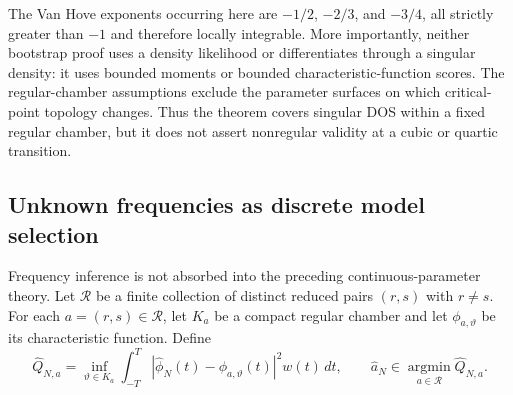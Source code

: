 \documentclass[11pt]{amsart}
\numberwithin{equation}{section}\setcounter{tocdepth}{3}\setcounter{secnumdepth}{3}
\begin{document}
The Van Hove exponents occurring here are $-1/2$, $-2/3$, and $-3/4$, all strictly
greater than $-1$ and therefore locally integrable.  More importantly, neither bootstrap
proof uses a density likelihood or differentiates through a singular density: it uses
bounded moments or bounded characteristic-function scores.  The regular-chamber
assumptions exclude the parameter surfaces on which critical-point topology changes.
Thus the theorem covers singular DOS within a fixed regular chamber, but it does not
assert nonregular validity at a cubic or quartic transition.

\subsection{Unknown frequencies as discrete model selection}\label{subsec:frequency_selection}
Frequency inference is not absorbed into the preceding continuous-parameter theory.  Let
$\mathcal R$ be a finite collection of distinct reduced pairs $(r,s)$ with $r\ne s$.
For each $a=(r,s)\in\mathcal R$, let $K_a$ be a compact regular chamber and let
$\phi_{a,\vartheta}$ be its characteristic function.  Define
\begin{equation}
 \widehat Q_{N,a}=\inf_{\vartheta\in K_a}
 \int_{-T}^T|\widehat\phi_N(t)-\phi_{a,\vartheta}(t)|^2w(t)\,dt,
 \qquad
 \widehat a_N\in\operatorname*{argmin}_{a\in\mathcal R}\widehat Q_{N,a}.
 \label{eq:frequency_selector}
\end{equation}
\end{document}
